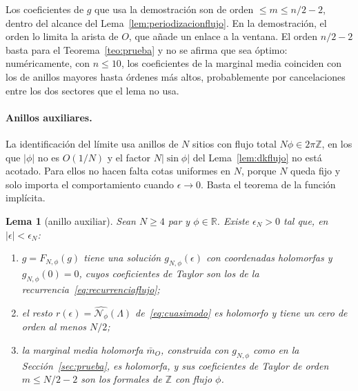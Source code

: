 \documentclass[11pt,a4paper]{article}
\newtheorem{lema}[teorema]{Lema}
\theoremstyle{remark}
\begin{document}
Los coeficientes de $g$ que usa la demostración son de orden $\le m\le n/2-2$, dentro del alcance del
Lema~\ref{lem:periodizacionflujo}. En la demostración, el orden lo limita la arista de $O$, que añade un
enlace a la ventana. El orden $n/2-2$ basta para el Teorema~\ref{teo:prueba} y no se afirma que sea
óptimo: numéricamente, con $n\le10$, los coeficientes de la marginal media coinciden con los de anillos
mayores hasta órdenes más altos, probablemente por cancelaciones entre los dos sectores que el lema
no usa.

\paragraph{Anillos auxiliares.} La identificación del límite usa anillos de $N$ sitios con flujo total
$N\phi\in2\pi\mathbb Z$, en los que $|\phi|$ no es $O(1/N)$ y el factor $N|\sin\phi|$ del
Lema~\ref{lem:dkflujo} no está acotado. Para ellos no hacen falta cotas uniformes en $N$, porque $N$ queda
fijo y solo importa el comportamiento cuando $\epsilon\to0$. Basta el teorema de la función implícita.

\begin{lema}[anillo auxiliar]\label{lem:auxiliar}
Sean $N\ge4$ par y $\phi\in\mathbb R$. Existe $\epsilon_N>0$ tal que, en $|\epsilon|<\epsilon_N$:
\begin{enumerate}
\item[(i)] $g=F_{N,\phi}(g)$ tiene una solución $g_{N,\phi}(\epsilon)$ con coordenadas holomorfas y
  $g_{N,\phi}(0)=0$, cuyos coeficientes de Taylor son los de la recurrencia~\eqref{eq:recurrenciaflujo};
\item[(ii)] el resto $r(\epsilon)=\widehat{\mathcal N_\phi}(\Lambda)$ de~\eqref{eq:cuasimodo} es holomorfo y tiene un
  cero de orden al menos $N/2$;
\item[(iii)] la marginal media holomorfa $\bar m_O$, construida con $g_{N,\phi}$ como en la
  Sección~\ref{sec:prueba}, es holomorfa, y sus coeficientes de Taylor de orden $m\le N/2-2$ son los
  formales de $\mathbb Z$ con flujo $\phi$.
\end{enumerate}
\end{lema}
\end{document}
